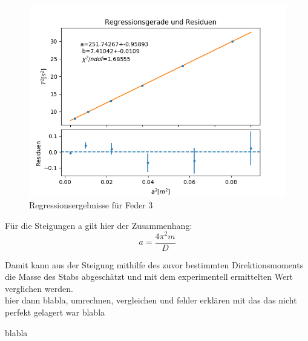 \documentclass[12pt,a4paper]{article}
\begin{document}
\begin{figure}
\begin{center}
\includegraphics[scale=0.8]{Bilder/SteinerFeder3Komplett}
\end{center}
\caption{Regressionsergebnisse für Feder 3}
\label{fig:SteinerReg3}
\end{figure}

Für die Steigungen a gilt hier der Zusammenhang:
\begin{equation}
a=\frac{4\pi^2 m}{D}
\end{equation}

Damit kann aus der Steigung mithilfe des zuvor bestimmten Direktionsmoments die Masse des Stabs abgeschätzt und mit dem experimentell ermittelten Wert verglichen werden.\\

hier dann blabla, umrechnen, vergleichen und fehler erklären mit das das nicht perfekt gelagert war blabla

blabla
\end{document}
